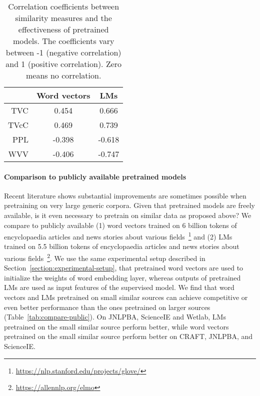 \documentclass[11pt,a4paper]{article}
\begin{document}
\begin{table}[tb]
    \centering
    \begin{small}
    \begin{tabular}{r|c|c}
    \toprule
     & \bf Word vectors & \bf LMs \\ \midrule
     TVC & \phantom{0}0.454 & \phantom{0}0.666 \\
     TVcC & \phantom{0}0.469 & \phantom{0}0.739 \\
     PPL & -0.398 & -0.618 \\
     WVV & -0.406 & -0.747 \\
     \bottomrule
     \end{tabular}
    \caption{\label{tab:predictiveness}Correlation coefficients between similarity measures and the effectiveness of pretrained models. The coefficients vary between -1 (negative correlation) and 1 (positive correlation). Zero means no correlation.}
    \end{small}
\end{table}

\paragraph{Comparison to publicly available pretrained models}
Recent literature shows substantial improvements are sometimes possible when pretraining on very large generic corpora. 
Given that pretrained models are freely available, is it even necessary to pretrain on similar data as proposed above? 
We compare to publicly available (1) word vectors trained on 6 billion tokens of encyclopaedia articles and news stories about various fields~\footnote{\href{https://nlp.stanford.edu/projects/glove/}{https://nlp.stanford.edu/projects/glove/}} and (2) LMs trained on 5.5 billion tokens of encyclopaedia articles and news stories about various fields~\footnote{\href{https://allennlp.org/elmo}{https://allennlp.org/elmo}}. We use the same experimental setup described in Section~\ref{section:experimental-setup}, that pretrained word vectors are used to initialize the weights of word embedding layer, whereas outputs of pretrained LMs are used as input features of the supervised model.
We find that word vectors and LMs pretrained on small similar sources can achieve competitive or even better performance than the ones pretrained on larger sources (Table~\ref{tab:compare-public}). 
On JNLPBA, ScienceIE and Wetlab, LMs pretrained on the small similar source perform better, while word vectors pretrained on the small similar source perform better on CRAFT, JNLPBA, and ScienceIE.
\end{document}
